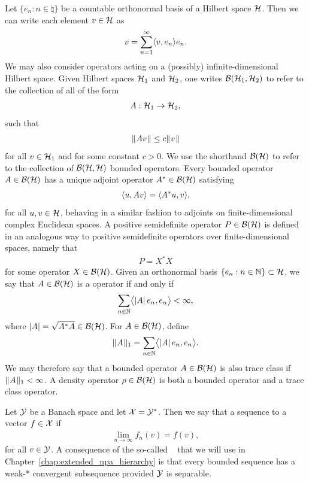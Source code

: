 Let $\{e_n : n \in \natural \}$ be a countable orthonormal basis of a Hilbert space $\mathcal{H}$. Then we can write each element $v \in \mathcal{H}$ as 
\begin{align}
	v = \sum_{n=1}^{\infty} \langle v , e_n\rangle e_n.
\end{align}
We may also consider operators acting on a (possibly) infinite-dimensional Hilbert space. Given Hilbert spaces $\mathcal{H}_1$ and $\mathcal{H}_2$, one writes $\mathcal{B}(\mathcal{H}_1,\mathcal{H}_2)$ to refer to the collection of all  of the form
\begin{align}
	A : \mathcal{H}_1 \rightarrow \mathcal{H}_2,
\end{align}
such that 
\begin{align}
	\lVert\mspace{1mu} Av \mspace{1mu}\rVert \leq c\lVert\mspace{1mu} v \mspace{1mu}\rVert
\end{align}
for all $v \in \mathcal{H}_1$ and for some constant $c > 0$. We use the shorthand $\mathcal{B}(\mathcal{H})$ to refer to the collection of $\mathcal{B}(\mathcal{H},\mathcal{H})$ bounded operators. Every bounded operator $A \in \mathcal{B}(\mathcal{H})$ has a unique adjoint operator $A^* \in \mathcal{B}(\mathcal{H})$ satisfying 
\begin{align}
	\langle u , Av\rangle = \langle A^*u , v\rangle,
\end{align}
for all $u,v \in \mathcal{H}$, behaving in a similar fashion to adjoints on finite-dimensional complex Euclidean spaces. A positive semidefinite operator $P \in \mathcal{B}(\mathcal{H})$ is defined in an analogous way to positive semidefinite operators over finite-dimensional spaces, namely that 
\begin{align}
	P = X^*X
\end{align}
for some operator $X \in \mathcal{B}(\mathcal{H})$. Given an orthonormal basis $\{e_n : n \in \mathbb{N}\} \subset \mathcal{H}$, we say that $A \in \mathcal{B}(\mathcal{H})$ is a  operator if and only if 
\begin{align}
	\sum_{n \in \mathbb{N}} \bigl\langle  \left\lvert A \right\rvert e_n, e_n \bigr\rangle < \infty,
\end{align} 
where $\left\lvert A \right\rvert = \sqrt{A^*A} \in \mathcal{B}(\mathcal{H})$. For $A \in \mathcal{B}(\mathcal{H})$, define 
\begin{align}
	\lVert\mspace{1mu} A \mspace{1mu}\rVert_1 = \sum_{n \in \mathbb{N}} \bigl\langle \left\lvert A \right\rvert e_n, e_n \bigr\rangle.
\end{align}
We may therefore say that a bounded operator $A \in \mathcal{B}(\mathcal{H})$ is also trace class if $\lVert\mspace{1mu} A \mspace{1mu}\rVert_1 < \infty$. A density operator $\rho \in \mathcal{B}(\mathcal{H})$ is both a bounded operator and a trace class operator.  

Let $\mathcal{Y}$ be a Banach space and let $\mathcal{X} = \mathcal{Y}^*$. Then we say that a sequence  to a vector $f \in \mathcal{X}$ if 
\begin{align}
	\lim_{n \rightarrow \infty} f_n(v) = f(v),
\end{align}
for all $v \in \mathcal{Y}$. A consequence of the so-called ~\cite{Rudin1991} that we will use in Chapter~\ref{chap:extended_npa_hierarchy} is that every bounded sequence has a weak-* convergent subsequence provided $\mathcal{Y}$ is separable. 
 
